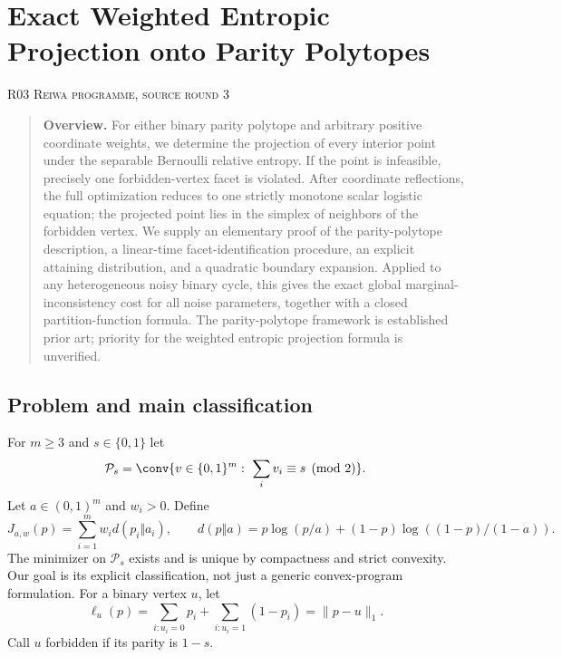 \documentclass[11pt,a4paper]{article}
\theoremstyle{definition}\newtheorem{definition}[theorem]{Definition}
\theoremstyle{remark}\newtheorem{remark}[theorem]{Remark}
\numberwithin{equation}{section}
\begin{document}
\clearpage
\section[R03 --- Exact Weighted Entropic Projection onto Parity Polytopes]{Exact Weighted Entropic Projection onto Parity Polytopes}\label{contrib-R03}
\noindent\textsc{R03 \quad Reiwa programme, source round 3}\par\medskip


\begin{quote}\small\textbf{Overview.} For either binary parity polytope and arbitrary positive coordinate weights, we determine the projection of every interior point under the separable Bernoulli relative entropy. If the point is infeasible, precisely one forbidden-vertex facet is violated. After coordinate reflections, the full optimization reduces to one strictly monotone scalar logistic equation; the projected point lies in the simplex of neighbors of the forbidden vertex. We supply an elementary proof of the parity-polytope description, a linear-time facet-identification procedure, an explicit attaining distribution, and a quadratic boundary expansion. Applied to any heterogeneous noisy binary cycle, this gives the exact global marginal-inconsistency cost for all noise parameters, together with a closed partition-function formula. The parity-polytope framework is established prior art; priority for the weighted entropic projection formula is unverified.\end{quote}

\subsection{Problem and main classification}\label{R03-sec-1}
For $m\geq3$ and $s\in\{0,1\}$ let
\[
\mathcal P_s=\conv\{v\in\{0,1\}^m:\ \sum_iv_i\equiv s\pmod2\}.
\]
Let $a\in(0,1)^m$ and $w_i>0$. Define
\[
J_{a,w}(p)=\sum_{i=1}^mw_i d(p_i\Vert a_i),\qquad
 d(p\Vert a)=p\log(p/a)+(1-p)\log((1-p)/(1-a)).
\]
The minimizer on $\mathcal P_s$ exists and is unique by compactness and strict convexity. Our goal is its explicit classification, not just a generic convex-program formulation.
For a binary vertex $u$, let
\[
\ell_u(p)=\sum_{i:u_i=0}p_i+\sum_{i:u_i=1}(1-p_i)=\|p-u\|_1.
\]
Call $u$ forbidden if its parity is $1-s$.
\end{document}
